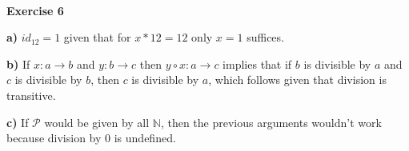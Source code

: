 \documentclass[a4paper,12pt,twoside,leqno]{article}
\begin{document}
\paragraph*{}
\textbf{Exercise 6}\par 
\textbf{a)} $id_{12} = 1$ given that for $x * 12 = 12$ only $x = 1$ suffices.\par
\textbf{b)} If $x: a \rightarrow b$ and $y: b \rightarrow c$ then $y \circ x: a \rightarrow c$ implies that if $b$ is divisible by $a$ and $c$ is divisible by $b$, then $c$ is divisible by $a$, which follows given that division is transitive. \par 
\textbf{c)} If $\mathcal{P}$ would be given by all $\mathbb{N}$, then the previous arguments wouldn't work because division by 0 is undefined.
\end{document}
